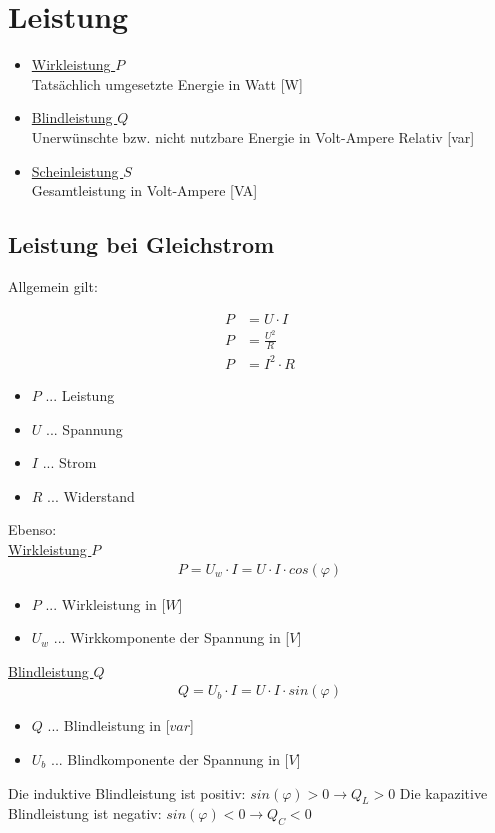 \chapter{Leistung}
\begin{itemize}
    \item \underline{Wirkleistung $P$} \\
    Tatsächlich umgesetzte Energie in Watt [W]
    \item \underline{Blindleistung $Q$} \\
    Unerwünschte bzw. nicht nutzbare Energie in Volt-Ampere Relativ [var]
    \item \underline{Scheinleistung $S$} \\
    Gesamtleistung in Volt-Ampere [VA]
\end{itemize}

\section{Leistung bei Gleichstrom}
Allgemein gilt:

\begin{align}
    P&=U\cdot I \\
    P&=\frac{U^2}{R} \\
    P&=I^2\cdot R    
\end{align}

\begin{itemize}
    \item $P$ ... Leistung
    \item $U$ ... Spannung
    \item $I$ ... Strom
    \item $R$ ... Widerstand
\end{itemize}

\newpage

Ebenso: \\
\underline{Wirkleistung $P$}
\begin{align}
    P = U_w \cdot I = U \cdot I \cdot cos(\varphi)
\end{align}
\begin{itemize}
    \item $P$ ... Wirkleistung in [$W$]
    \item $U_w$ ... Wirkkomponente der Spannung in [$V$]
\end{itemize}

\underline{Blindleistung $Q$}
\begin{align}
    Q = U_b \cdot I = U \cdot I \cdot sin(\varphi)
\end{align}
\begin{itemize}
    \item $Q$ ... Blindleistung in [$var$]
    \item $U_b$ ... Blindkomponente der Spannung in [$V$]
\end{itemize}
Die induktive Blindleistung ist positiv: $sin(\varphi) > 0 \rightarrow Q_L > 0$
Die kapazitive Blindleistung ist negativ: $sin(\varphi) < 0 \rightarrow Q_C < 0$

